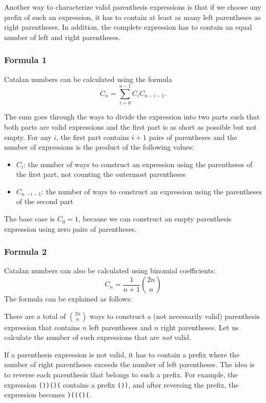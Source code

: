 Another way to characterize valid
parenthesis expressions is that if
we choose any prefix of such an expression,
it has to contain at least as many left
parentheses as right parentheses.
In addition, the complete expression has to
contain an equal number of left and right
parentheses.

\subsubsection{Formula 1}

Catalan numbers can be calculated using the formula
\[ C_n = \sum_{i=0}^{n-1} C_{i} C_{n-i-1}.\]

The sum goes through the ways to divide the
expression into two parts
such that both parts are valid
expressions and the first part is as short as possible
but not empty.
For any $i$, the first part contains $i+1$ pairs
of parentheses and the number of expressions
is the product of the following values:

\begin{itemize}
    \item $C_{i}$: the number of ways to construct an expression
          using the parentheses of the first part,
          not counting the outermost parentheses
    \item $C_{n-i-1}$: the number of ways to construct an
          expression using the parentheses of the second part
\end{itemize}

The base case is $C_0=1$,
because we can construct an empty parenthesis
expression using zero pairs of parentheses.

\subsubsection{Formula 2}

Catalan numbers can also be calculated
using binomial coefficients:
\[ C_n = \frac{1}{n+1} \binom{2n}{n}\]
The formula can be explained as follows:

There are a total of $\binom{2n}{n}$ ways
to construct a (not necessarily valid)
parenthesis expression that contains $n$ left
parentheses and $n$ right parentheses.
Let us calculate the number of such
expressions that are \emph{not} valid.

If a parenthesis expression is not valid,
it has to contain a prefix where the
number of right parentheses exceeds the
number of left parentheses.
The idea is to reverse each parenthesis
that belongs to such a prefix.
For example, the expression
\texttt{())()(} contains a prefix \texttt{())},
and after reversing the prefix,
the expression becomes \texttt{)((()(}.

